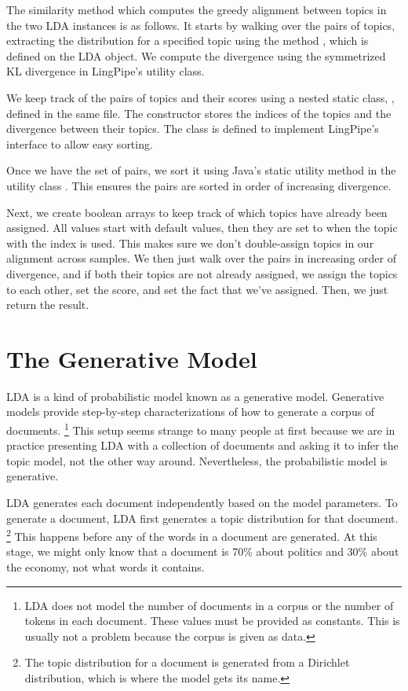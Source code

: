 The similarity method which computes the greedy alignment between
topics in the two LDA instances is as follows.
%
%
It starts by walking over the pairs of topics, extracting the
distribution for a specified topic using the method
, which is defined on the LDA object.
We compute the divergence using the symmetrized KL divergence in
LingPipe's  utility class.  

We keep track of the pairs of topics and their scores using
a nested static class, , defined in the same file.
%
%
The constructor stores the indices of the topics and the divergence
between their topics.  The class is defined to implement LingPipe's
 interface to allow easy sorting.  

Once we have the set of pairs, we sort it using Java's static
 utility method in the utility class .
This ensures the pairs are sorted in order of increasing divergence.

Next, we create boolean arrays to keep track of which topics have
already been assigned.  All values start with default 
values, then they are set to  when the topic with the index
is used.  This makes sure we don't double-assign topics in our
alignment across samples.  We then just walk over the pairs in
increasing order of divergence, and if both their topics are not
already assigned, we assign the topics to each other, set the score,
and set the fact that we've assigned.  Then, we just return the result.

\section{The Generative Model}

LDA is a kind of probabilistic model known as a generative model.
Generative models provide step-by-step characterizations of how to
generate a corpus of documents.%
%
\footnote{LDA does not model the number of documents in a corpus
or the number of tokens in each document.  These values must be
provided as constants.  This is usually not a problem because
the corpus is given as data.}
%
This setup seems strange to many people at first because we are in
practice presenting LDA with a collection of documents and asking it
to infer the topic model, not the other way around.  Nevertheless, the
probabilistic model is generative.

LDA generates each document independently based on the model
parameters.  To generate a document, LDA first generates a topic
distribution for that document.%
%
\footnote{The topic distribution for a document is generated from
a Dirichlet distribution, which is where the model gets its name.}
%
This happens before any of the words in a document are generated.  At
this stage, we might only know that a document is 70\% about politics
and 30\% about the economy, not what words it contains.

